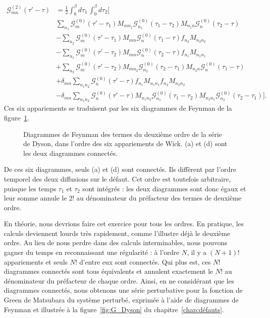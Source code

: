 \begin{align}
    \mathcal{G}^{(2)}_{mn}(\tau'-\tau) &= \frac{1}{2}\int_0^\beta d\tau_1\,\int_0^\beta d\tau_2\Big[\nonumber\\
    &\sum_{n_1}\mathcal{G}^{(0)}_m(\tau'-\tau_1)M_{mn_1}\mathcal{G}^{(0)}_{n_1}(\tau_1-\tau_2)M_{n_1n}\mathcal{G}_n^{(0)}(\tau_2-\tau)\nonumber\\
    & -\sum_{n_2}\mathcal{G}^{(0)}_m(\tau'-\tau_1)M_{mn}\mathcal{G}^{(0)}_n(\tau_1-\tau)f_{n_2}M_{n_2n_2}\nonumber\\
    &-\sum_{n_1}\mathcal{G}^{(0)}_m(\tau'-\tau_2)M_{mn}\mathcal{G}^{(0)}_n(\tau_2-\tau)f_{n_1}M_{n_1n_1}\nonumber\\
    &+\sum_{n_2}\mathcal{G}^{(0)}_m(\tau'-\tau_2)M_{mn_2}\mathcal{G}_{n_2}^{(0)}(\tau_2-\tau_1)M_{n_2n}\mathcal{G}_n^{(0)}(\tau_1-\tau)\nonumber\\
    &+\delta_{mn}\sum_{n_1n_2}\mathcal{G}_n^{(0)}(\tau'-\tau)f_{n_1}M_{n_1n_1}f_{n_2}M_{n_2n_2}\nonumber\\
    &-\delta_{mn}\sum_{n_1n_2}\mathcal{G}^{(0)}_n(\tau'-\tau)M_{n_1n_2}\mathcal{G}_{n_1}^{(0)}(\tau_1-\tau_2)M_{n_2n_1}\mathcal{G}^{(0)}_{n_2}(\tau_2-\tau_1)
    \Big].
\end{align}
Ces six appariements se traduisent par les six diagrammes de Feynman de la figure~\ref{fig:dyson_ordre2}.
\begin{figure}[htbp]
    \centering
    
    \caption[Diagrammes de Feynman des termes du deuxième ordre de la série de Dyson.]{Diagrammes de Feynman des termes du deuxième ordre de la série de Dyson, dans l'ordre des six appariements de Wick. (a) et (d) sont les deux diagrammes connectés.}
    \label{fig:dyson_ordre2}
\end{figure}

De ces six diagrammes, seuls (a) et (d) sont connectés. Ils diffèrent par l'ordre temporel des deux diffusions sur le défaut. Cet ordre est toutefois arbitraire, puisque les temps $\tau_1$ et $\tau_2$ sont intégrés : les deux diagrammes sont donc égaux et leur somme annule le $2!$ au dénominateur du préfacteur des termes de deuxième ordre.

En théorie, nous devrions faire cet exercice pour tous les ordres. En pratique, les calculs deviennent lourds très rapidement, comme l'illustre déjà le deuxième ordre. Au lieu de nous perdre dans des calculs interminables, nous pouvons gagner du temps en reconnaissant une régularité : à l'ordre $N$, il y a $(N+1)!$ appariements et seuls $N!$ d'entre eux sont connectés. Qui plus est, ces $N!$ diagrammes connectés sont tous équivalents et annulent exactement le $N!$ au dénominateur du préfacteur de chaque ordre. Ainsi, en ne considérant que les diagrammes connectés, nous obtenons une série perturbative pour la fonction de Green de Matsubara du système perturbé, exprimée à l'aide de diagrammes de Feynman et illustrée à la figure~\ref{fig:G_Dyson} du chapitre~\ref{chap:défauts}.

